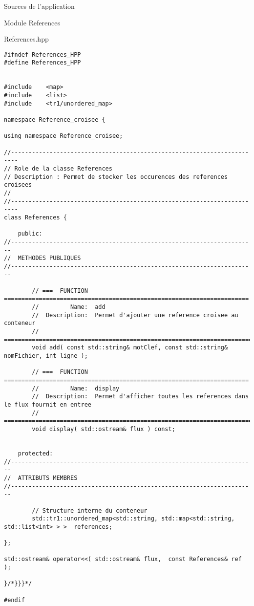 \documentclass{article}
\begin{document}
\begin{section}{Sources de l'application}
\begin{subsection}{Module References}
\begin{paragraph}{References.hpp}
\begin{verbatim}
#ifndef References_HPP
#define References_HPP


#include    <map>
#include    <list>
#include    <tr1/unordered_map>

namespace Reference_croisee {

using namespace Reference_croisee;

//------------------------------------------------------------------------
// Role de la classe References
// Description : Permet de stocker les occurences des references croisees
//
//------------------------------------------------------------------------
class References {

    public:
//----------------------------------------------------------------------
//  METHODES PUBLIQUES
//----------------------------------------------------------------------

        // ===  FUNCTION  ======================================================================
        //         Name:  add
        //  Description:  Permet d'ajouter une reference croisee au conteneur
        // =====================================================================================
        void add( const std::string& motClef, const std::string& nomFichier, int ligne );

        // ===  FUNCTION  ======================================================================
        //         Name:  display
        //  Description:  Permet d'afficher toutes les references dans le flux fournit en entree
        // =====================================================================================
        void display( std::ostream& flux ) const;


    protected:
//----------------------------------------------------------------------
//  ATTRIBUTS MEMBRES
//----------------------------------------------------------------------

        // Structure interne du conteneur
        std::tr1::unordered_map<std::string, std::map<std::string, std::list<int> > > _references;

};

std::ostream& operator<<( std::ostream& flux,  const References& ref );

}/*}}}*/

#endif

  \end{verbatim}
  \end{paragraph}




\end{subsection}
\end{section}
\end{document}
